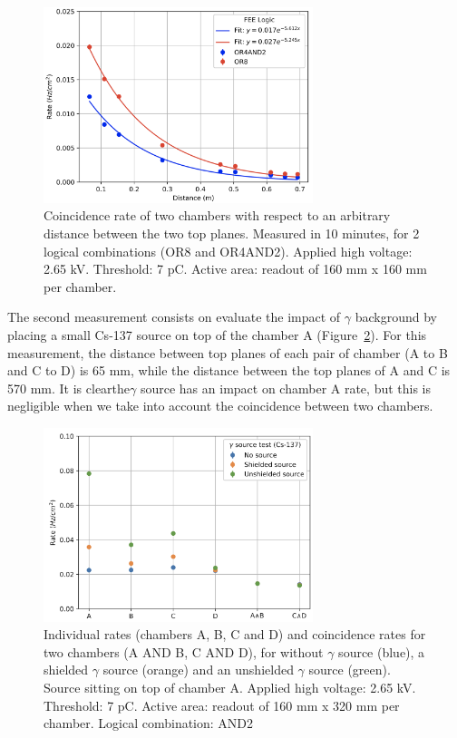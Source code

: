 \begin{figure}[h]
\begin{center}
\includegraphics[width=0.7\textwidth,keepaspectratio]{figures_and_tables/rpc/mwpc/coincidence.png}
\end{center}
\caption{Coincidence rate of two chambers with respect to an arbitrary distance between the two top planes. Measured in 10 minutes, for 2 logical combinations (OR8 and OR4AND2). Applied high voltage: 2.65 kV. Threshold: 7 pC. Active area: readout of 160 mm x 160 mm per chamber.}
\label{coincidence}
\end{figure}

The second measurement consists on evaluate the impact of $\gamma$ background by placing a small Cs-137 source on top of the chamber A (Figure~\ref{gamma}). For this measurement, the distance between top planes of each pair of chamber (A to B and C to D) is 65 mm, while the distance between the top planes of A and C is 570 mm. It is clearthe$\gamma$ source has an impact on chamber A rate, but this is negligible when we take into account the coincidence between two chambers.

\begin{figure}[h]
\begin{center}
\includegraphics[width=0.7\textwidth,keepaspectratio]{figures_and_tables/rpc/mwpc/gamma.png}
\end{center}
\caption{Individual rates (chambers A, B, C and D) and coincidence rates for two chambers (A AND B, C AND D), for without $\gamma$ source (blue), a shielded $\gamma$ source (orange) and an unshielded $\gamma$ source (green). Source sitting on top of chamber A. Applied high voltage: 2.65 kV. Threshold: 7 pC. Active area: readout of 160 mm x 320 mm per chamber. Logical combination: AND2}
\label{gamma}
\end{figure}

